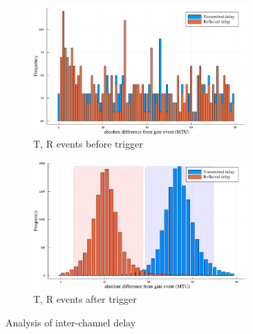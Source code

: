\documentclass[10pt, final]{article}
\begin{document}
\begin{mdframed}
    \begin{figure}[H]
        \begin{subfigure}{\textwidth}
            \centering
            \includegraphics[width = 0.9\textwidth]{../images/before.pdf}
            \caption{T, R events before trigger}
            \label{our}
        \end{subfigure}

        \begin{subfigure}{\textwidth}
            \centering
            \includegraphics[width = 0.9\textwidth]{../images/after.pdf}
            \caption{T, R events after trigger}
        \end{subfigure}
        \caption{Analysis of inter-channel delay}
    \end{figure}
\end{mdframed}
\end{document}
